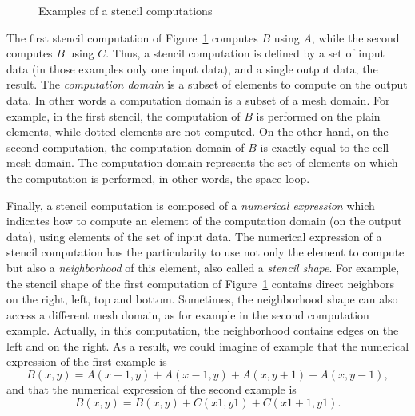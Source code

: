 \begin{figure}[!h]\begin{center}
  \caption{Examples of a stencil computations}
  \label{fig:ex}
\end{center}\end{figure}

The first stencil computation of Figure~\ref{fig:ex} computes $B$ using $A$, while the second computes $B$ using $C$. Thus, a stencil computation is defined by a set of input data (in those examples only one input data), and a single output data, the result. The \emph{computation domain} is a subset of elements to compute on the output data. In other words a computation domain is a subset of a mesh domain. For example, in the first stencil, the computation of $B$ is performed on the plain elements, while dotted elements are not computed. On the other hand, on the second computation, the computation domain of $B$ is exactly equal to the cell mesh domain. The computation domain represents the set of elements on which the computation is performed, in other words, the space loop.

Finally, a stencil computation is composed of a \emph{numerical expression} which indicates how to compute an element of the computation domain (on the output data), using elements of the set of input data. The numerical expression of a stencil computation has the particularity to use not only the element to compute but also a \emph{neighborhood} of this element, also called a \emph{stencil shape}. For example, the stencil shape of the first computation of Figure~\ref{fig:ex} contains direct neighbors on the right, left, top and bottom. Sometimes, the neighborhood shape can also access a different mesh domain, as for example in the second computation example. Actually, in this computation, the neighborhood contains edges on the left and on the right. As a result, we could imagine of example that the numerical expression of the first example is
\begin{equation*} 
B(x,y) = A(x+1,y)+A(x-1,y)+A(x,y+1)+A(x,y-1),
\end{equation*}
and that the numerical expression of the second example is
\begin{equation*} 
B(x,y) = B(x,y)+C(x1,y1)+C(x1+1,y1).
\end{equation*}

